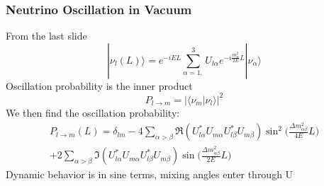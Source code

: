 \documentclass[10pt,professionalfonts,xcolor=table]{beamer}
\begin{document}
\frame
{
  \frametitle{Neutrino Oscillation in Vacuum}
  \begin{itemize}
  \bang From the last slide
	\begin{equation*}
		|\nu_l(L) \rangle = e^{-iEL} \sum_{\alpha = 1,}^3 U_{l\alpha}e^{-i\frac{m_\alpha^2}{2E} L}|\nu_\alpha \rangle
	\end{equation*}
\bang Oscillation probability is the inner product
  \begin{equation*}
P_{l\rightarrow m} = 	 |\langle \nu_m|\nu_l \rangle|^2
	\end{equation*}
	\bang We then find the oscillation probability:
	\begin{equation*}\begin{split}
P_{l\rightarrow m}(L) =  \delta_{lm} - 4  \sum_{\alpha > \beta}  \Re(U^*_{l\alpha}U_{m\alpha}U^*_{l\beta}U_{m\beta}) \sin^2 \bigg(\frac{\Delta m_{\alpha\beta}^2}{4E} L\bigg) \\
 + 2  \sum_{\alpha>\beta}  \Im(U^*_{l\alpha}U_{m\alpha}U^*_{l\beta}U_{m\beta}) \sin\bigg(\frac{\Delta m_{\alpha\beta}^2}{2E}L\bigg)
\end{split}\end{equation*}
	\bang Dynamic behavior is in sine terms, mixing angles enter through U


  \end{itemize}
}
\end{document}
